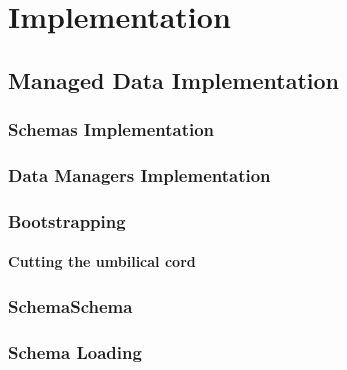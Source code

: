 \chapter{Implementation}\label{Implementation}

\section{Managed Data Implementation}\label{Managed Data Implementation}

\subsection{Schemas Implementation}\label{Schemas Implementation}

\subsection{Data Managers Implementation}\label{Data Managers Implementation}

\subsection{Bootstrapping}\label{Bootstrapping}

\subsubsection{Cutting the umbilical cord}\label{Cutting the umbilical cord}

\subsection{SchemaSchema}\label{SchemaSchema}

\subsection{Schema Loading}\label{Schema Loading}

